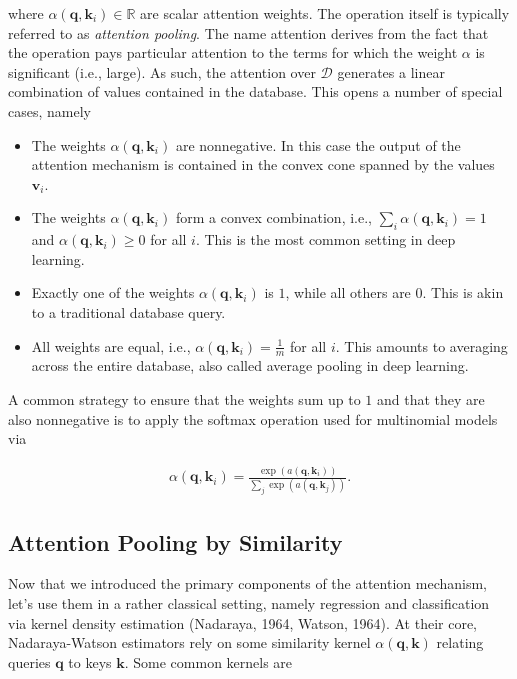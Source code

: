 \documentclass[a4paper,12pt]{article}
\theoremstyle{definition}
\begin{document}
where $\alpha(\mathbf{q}, \mathbf{k}_i) \in \mathbb{R}$ are scalar attention weights. The operation itself is typically referred to as \emph{attention pooling}.
The name attention derives from the fact that the operation pays particular attention to the terms for which the weight $\alpha$ is significant (i.e., large).
As such, the attention over $\mathcal{D}$ generates a linear combination of values contained in the database. This opens a number of special cases, namely
\begin{itemize}
    \item The weights $\alpha(\mathbf{q}, \mathbf{k}_i)$ are nonnegative. In this case the output of the attention mechanism is contained in the convex cone spanned by the values $\mathbf{v}_i$.
    \item The weights $\alpha(\mathbf{q}, \mathbf{k}_i)$ form a convex combination, i.e., $\sum_i \alpha(\mathbf{q}, \mathbf{k}_i) = 1$ and $\alpha(\mathbf{q}, \mathbf{k}_i) \geq 0$ for all $i$.
          This is the most common setting in deep learning.
    \item Exactly one of the weights $\alpha(\mathbf{q}, \mathbf{k}_i)$ is $1$, while all others are $0$. This is akin to a traditional database query.
    \item All weights are equal, i.e., $\alpha(\mathbf{q}, \mathbf{k}_i) = \frac{1}{m}$ for all $i$. This amounts to averaging across the entire database, also called average pooling in deep learning.
\end{itemize}
A common strategy to ensure that the weights sum up to $1$ and that they are also nonnegative is to apply the softmax operation used for multinomial models via

\begin{align*}
    \alpha(\mathbf{q}, \mathbf{k}_i) = \frac{\exp(a(\mathbf{q}, \mathbf{k}_i))}{\sum_j \exp(a(\mathbf{q}, \mathbf{k}_j))}.
\end{align*}


\subsection*{Attention Pooling by Similarity}
Now that we introduced the primary components of the attention mechanism, let’s use them in a rather classical setting, namely regression and classification via kernel density estimation (Nadaraya, 1964, Watson, 1964).
At their core, Nadaraya-Watson estimators rely on some similarity kernel $\alpha(\mathbf{q}, \mathbf{k})$ relating queries $\mathbf{q}$ to keys $\mathbf{k}$. Some common kernels are
\end{document}
